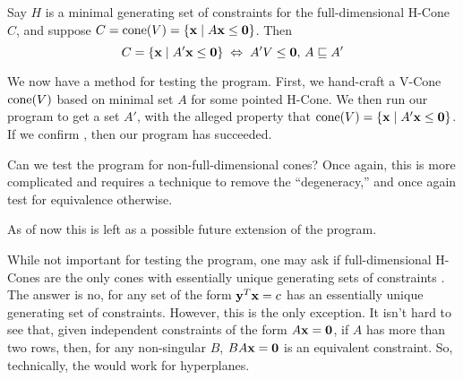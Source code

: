 \begin{EqCriteria}\label{eq_vc_hc}
	Say $H$ is a minimal generating set of constraints for the full-dimensional H-Cone $C$, and suppose $C = \operatorname{cone}(V) = \left\{\mathbf{x}\;|\; A\mathbf{x}\leq\mathbf{0}\right\}$.  Then
	\[ C = \left\{\mathbf{x}\;|\; A'\mathbf{x}\leq\mathbf{0}\right\} \;\Leftrightarrow\; A'V\leq\mathbf{0},\, A \sqsubseteq A' \]
\end{EqCriteria}

\begin{Test}\label{test_vc_to_hc}
	We now have a method for testing the program.  First, we hand-craft a V-Cone $\operatorname{cone}(V)$ based on minimal set $A$ for some pointed H-Cone. We then run our program to get a set $A'$, with the alleged property that $\operatorname{cone}(V) = \left\{\mathbf{x}\;|\; A'\mathbf{x}\leq\mathbf{0}\right\}$.  If we confirm , then our program has succeeded.
\end{Test}

\begin{Remark}
	Can we test the program for non-full-dimensional cones?  Once again, this is more complicated and requires a technique to remove the ``degeneracy,'' and once again test for equivalence otherwise.

	As of now this is left as a possible future extension of the program.
\end{Remark}

\begin{Remark}
	While not important for testing the program, one may ask if full-dimensional H-Cones are the only cones with essentially unique generating sets of constraints .  The answer is no, for any set of the form $\mathbf{y}^T \mathbf{x} = c$ has an essentially unique generating set of constraints.  However, this is the only exception.  It isn't hard to see that, given independent constraints of the form $A\mathbf{x}=\mathbf{0}$, if $A$ has more than two rows, then, for any non-singular $B$, $BA\mathbf{x}=\mathbf{0}$ is an equivalent constraint.  So, technically, the  would work for hyperplanes.
\end{Remark}

